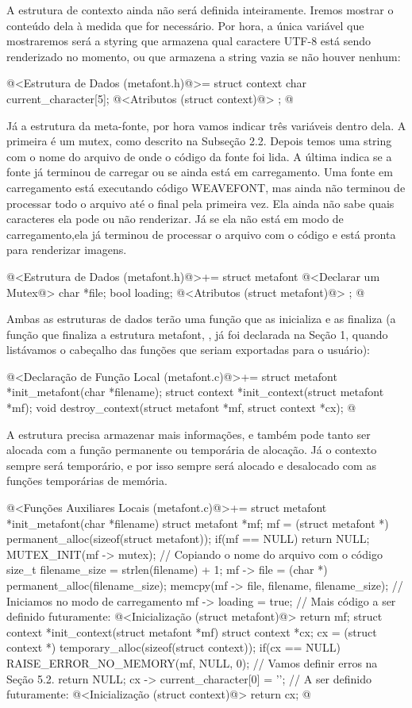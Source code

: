 A estrutura de contexto ainda não será definida inteiramente. Iremos
mostrar o conteúdo dela à medida que for necessário. Por hora, a única
variável que mostraremos será a styring que armazena qual caractere
UTF-8 está sendo renderizado no momento, ou que armazena a string
vazia se não houver nenhum:

\iniciocodigo
@<Estrutura de Dados (metafont.h)@>=
struct context{
  char current_character[5];
  @<Atributos (struct context)@>
};
@
\fimcodigo

Já a estrutura da meta-fonte, por hora vamos indicar três variáveis
dentro dela. A primeira é um mutex, como descrito na Subseção 2.2.
Depois temos uma string com o nome do arquivo de onde o código da
fonte foi lida. A última indica se a fonte já terminou de carregar ou
se ainda está em carregamento. Uma fonte em carregamento está
executando código WEAVEFONT, mas ainda não terminou de processar todo
o arquivo até o final pela primeira vez. Ela ainda não sabe quais
caracteres ela pode ou não renderizar. Já se ela não está em modo de
carregamento,ela já terminou de processar o arquivo com o código e
está pronta para renderizar imagens.

\iniciocodigo
@<Estrutura de Dados (metafont.h)@>+=
struct metafont{
  @<Declarar um Mutex@>
  char *file;
  bool loading;
  @<Atributos (struct metafont)@>
};
@
\fimcodigo

Ambas as estruturas de dados terão uma função que as inicializa e as
finaliza (a função que finaliza a estrutura
metafont, , já foi declarada na Seção
1, quando listávamos o cabeçalho das funções que seriam exportadas
para o usuário):

\iniciocodigo
@<Declaração de Função Local (metafont.c)@>+=
struct metafont *init_metafont(char *filename);
struct context *init_context(struct metafont *mf);
void destroy_context(struct metafont *mf, struct context *cx);
@
\fimcodigo

A estrutura  precisa armazenar mais informações,
e também pode tanto ser alocada com a função permanente ou temporária
de alocação. Já o contexto sempre será temporário, e por isso sempre
será alocado e desalocado com as funções temporárias de memória.

\iniciocodigo
@<Funções Auxiliares Locais (metafont.c)@>+=
struct metafont *init_metafont(char *filename){
  struct metafont *mf;
  mf = (struct metafont *) permanent_alloc(sizeof(struct metafont));
  if(mf == NULL)
    return NULL;
  MUTEX_INIT(mf -> mutex);
  // Copiando o nome do arquivo com o código
  size_t filename_size = strlen(filename) + 1;
  mf -> file = (char *) permanent_alloc(filename_size);
  memcpy(mf -> file, filename, filename_size);
  // Iniciamos no modo de carregamento
  mf -> loading = true;
  // Mais código a ser definido futuramente:
  @<Inicialização (struct metafont)@>
  return mf;
}
struct context *init_context(struct metafont *mf){
  struct context *cx;
  cx = (struct context *) temporary_alloc(sizeof(struct context));
  if(cx == NULL){
    RAISE_ERROR_NO_MEMORY(mf, NULL, 0); // Vamos definir erros na Seção 5.2.
    return NULL;
  }
  cx -> current_character[0] = '\0';
  // A ser definido futuramente:
  @<Inicialização (struct context)@>
  return cx;
}
@
\fimcodigo

